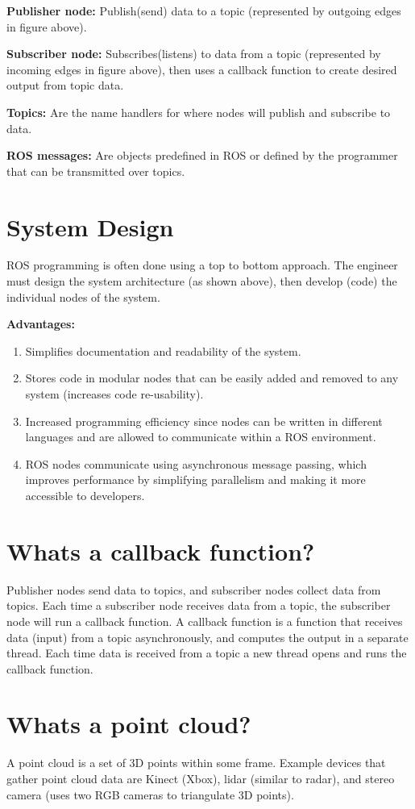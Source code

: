 \documentclass[11pt]{article}
\begin{document}
\textbf{Publisher node:} Publish(send) data to a topic (represented by outgoing edges in figure above).

\textbf{Subscriber node:} Subscribes(listens) to data from a topic (represented by incoming edges in figure above), then uses a callback function to create desired output from topic data.

\textbf{Topics:} Are the name handlers for where nodes will publish and subscribe to data.

\textbf{ROS messages:} Are objects predefined in ROS or defined by the programmer that can be transmitted over topics.

\section{System Design}
ROS programming is often done using a top to bottom approach. The engineer must design the system architecture (as shown above), then develop (code) the individual nodes of the system.

\textbf{Advantages:}
\begin{enumerate}
\item Simplifies documentation and readability of the system.
\item Stores code in modular nodes that can be easily added and removed to any system (increases code re-usability).
\item Increased programming efficiency since nodes can be written in different languages and are allowed to communicate within a ROS environment.
\item ROS nodes communicate using asynchronous message passing, which improves performance by simplifying parallelism and making it more accessible to developers.
\end{enumerate}

\section{Whats a callback function?}
Publisher nodes send data to topics, and subscriber nodes collect data from topics. Each time a subscriber node receives data from a topic, the subscriber node will run a callback function. A callback function is a function that receives data (input) from a topic asynchronously, and computes the output in a separate thread. Each time data is received from a topic a new thread opens and runs the callback function.

\section{Whats a point cloud?}
A point cloud is a set of 3D points within some frame. Example devices that gather point cloud data are Kinect (Xbox), lidar (similar to radar), and stereo camera (uses two RGB cameras to triangulate 3D points).
\end{document}
